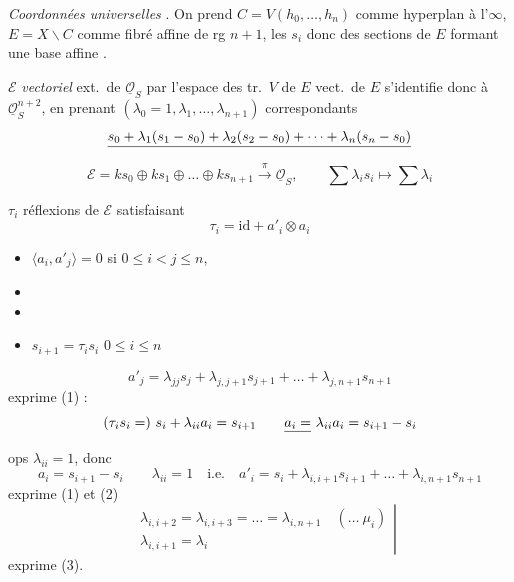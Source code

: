 \documentclass[11pt,a4paper]{article}
\begin{document}
\emph{Coordonnées universelles} . On prend $C = V(h_0, \dots, h_n)$ comme hyperplan à l'$\infty$,  $E = X \smallsetminus C$ comme fibré affine de rg $n+1$, les $s_i$  donc des sections de $E$ formant une base affine  .

$\mathcal{E}$ \emph{vectoriel}  ext.\ de $\underline{\mathcal{O}}_S$ par \struck{\ill{}} l'espace des tr.\ $V$ de $E$  vect.\ de $E$ s'identifie donc à $\underline{\mathcal{O}}_S^{n+2}$, en prenant \struck{\ill{}} $(\lambda_0 = 1, \lambda_1, \dots, \lambda_{n+1})$ correspondants
\[
\struck{s_0 + \lambda_1 (s_1 - s_0) + \lambda_2 (s_2 - s_0) + \dots + \lambda_n (s_n - s_0)}
\]
\[
\mathcal{E} = k s_0 \oplus k s_1 \oplus \dots \oplus k s_{n+1} \xrightarrow{\ \pi\ } \underline{\mathcal{O}}_S , \qquad \sum \lambda_i s_i \longmapsto \sum \lambda_i
\]

$\tau_i$ réflexions de $\mathcal{E}$ satisfaisant 
\[
\tau_i = \mathrm{id} + a'_i \otimes a_i
\]
\begin{itemize}
\item[(1)] $\langle a_i, a'_j \rangle = 0$ si $0 \leq i < j \leq n$, \  \add{[$\langle a_j, a'_i \rangle = 0$ si $0 \leq i \leq j \leq n$, $j \neq i+1$]}
\item[(3)] 
\item[] 
\item[(2)] $s_{i+1} = \tau_i s_i$ \quad $0 \leq i \leq n$
\end{itemize}

\[
a'_j = \lambda_{jj} s_j + \lambda_{j,j+1} s_{j+1} + \dots + \lambda_{j,n+1} s_{n+1}
\]
exprime (1) :
\[
(\tau_i s_i =)\ s_i + \lambda_{ii} a_i = s_{i+1} \qquad \struck{a_i =} \ \lambda_{ii} a_i = s_{i+1} - s_i
\]
ops $\lambda_{ii} = 1$, donc
\[
\boxed{a_i = s_{i+1} - s_i} \qquad \lambda_{ii} = 1 \quad \text{i.e.} \quad a'_i = s_i + \lambda_{i,i+1} s_{i+1} + \dots + \lambda_{i,n+1} s_{n+1}
\]
exprime (1) et (2)
\[
\left.
\begin{aligned}
&\lambda_{i,i+2} = \lambda_{i,i+3} = \dots = \lambda_{i,n+1} \quad (\ldots\ \mu_i) \\
&\lambda_{i,i+1} = \lambda_i
\end{aligned}
\right|
\]
exprime (3).
\end{document}
